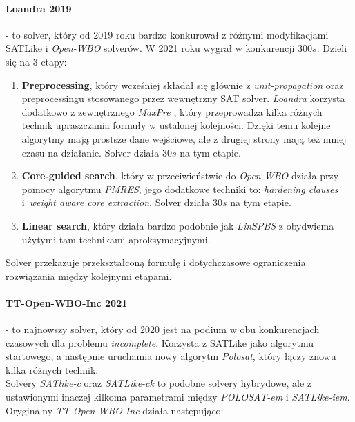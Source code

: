 \documentclass[shortabstract]{iithesis}
\begin{document}
\paragraph{Loandra 2019 \cite{loandra}} - to solver, który od 2019 roku bardzo konkurował z różnymi modyfikacjami SATLike i \textit{Open-WBO} solverów. W 2021 roku wygrał w konkurencji $300s$. Dzieli się na $3$ etapy:
\begin{enumerate}
	\item \textbf{Preprocessing}, który wcześniej składał się głównie z \textit{unit-propagation} oraz preprocessingu stosowanego przez wewnętrzny SAT solver. \textit{Loandra} korzysta dodatkowo z zewnętrznego \textit{MaxPre} \cite{maxpre}, który przeprowadza kilka różnych technik upraszczania formuły w ustalonej kolejności. Dzięki temu kolejne algorytmy mają prostsze dane wejściowe, ale z drugiej strony mają też mniej czasu na działanie. Solver działa $30s$ na tym etapie.
	\item \textbf{Core-guided search}, który w przeciwieństwie do \textit{Open-WBO} działa przy pomocy algorytmu \textit{PMRES}, jego dodatkowe techniki to: \textit{hardening clauses} i~\textit{weight aware core extraction}. Solver działa $30s$ na tym etapie.
	\item \textbf{Linear search}, który działa bardzo podobnie jak \textit{LinSPBS} z obydwiema użytymi tam technikami aproksymacyjnymi.
\end{enumerate}
Solver przekazuje przekształconą formułę i dotychczasowe ograniczenia rozwiązania między kolejnymi etapami.
\paragraph{TT-Open-WBO-Inc 2021 \cite{ttopenwbo}} - to najnowszy solver, który od $2020$ jest na podium w obu konkurencjach czasowych dla problemu \textit{incomplete}. Korzysta z SATLike jako algorytmu startowego, a następnie uruchamia nowy algorytm \textit{Polosat}, który łączy znowu kilka różnych technik. \\
Solvery \textit{SATlike-c} oraz \textit{SATLike-ck} to podobne solvery hybrydowe, ale z ustawionymi inaczej kilkoma parametrami między \textit{POLOSAT-em} i \textit{SATLike-iem}.
Oryginalny \textit{TT-Open-WBO-Inc} działa następująco:
\end{document}
